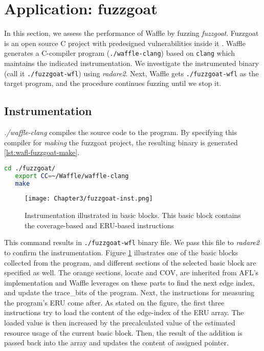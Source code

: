 \section{Application: fuzzgoat}
\label{sec:3-3}

In this section, we assess the performance of Waffle by fuzzing \textit{fuzzgoat}. Fuzzgoat is an open source C project with predesigned vulnerabilities inside it \cite{fuzzgoat}. Waffle generates a C-compiler program (\texttt{./waffle-clang}) based on \texttt{clang} which maintains the indicated instrumentation. We investigate the instrumented binary (call it \texttt{./fuzzgoat-wfl}) using \textit{radare2}. Next, Waffle gets \texttt{./fuzzgoat-wfl} as the target program, and the procedure continues fuzzing until we stop it. 


\subsection{Instrumentation}

\textit{./waffle-clang} compiles the source code to the program. By specifying this compiler for \textit{making} the fuzzgoat project, the resulting binary is generated \ref{lst:wafl-fuzzgoat-make}.

\begin{lstlisting}[language=bash,style=CommandStyle,label={lst:wafl-fuzzgoat-make}]
   cd ./fuzzgoat/
   export CC=~/Waffle/waffle-clang
   make
\end{lstlisting}


\begin{figure}[!b]
   \texttt{[image: Chapter3/fuzzgoat-inst.png]}
   \centering
   \caption{Instrumentation illustrated in basic blocks. This basic block contains the coverage-based and ERU-based instructions}
   \label{fig:fuzzgoat-inst}
\end{figure}

This command results in \texttt{./fuzzgoat-wfl} binary file. We pass this file to \textit{radare2} to confirm the instrumentation. Figure \ref{fig:fuzzgoat-inst} illustrates one of the basic blocks collected from the program, and different sections of the selected basic block are specified as well. The orange sections, locate and COV, are inherited from AFL's implementation and Waffle leverages on these parts to find the next edge index, and update the trace\_bits of the program. Next, the instructions for measuring the program's ERU come after. As stated on the figure, the first three instructions try to load the content of the edge-index of the ERU array. The loaded value is then increased by the precalculated value of the estimated resource usage of the current basic block. Then, the result of the addition is passed back into the array and updates the content of assigned pointer.

